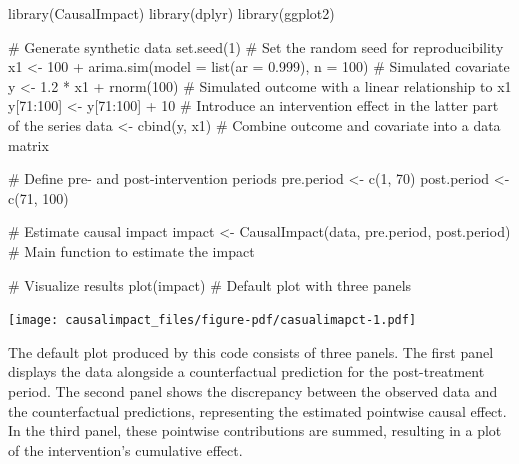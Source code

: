 \documentclass[
  letterpaper,
  DIV=11,
  numbers=noendperiod]{scrreprt}
\newenvironment{Shaded}{\begin{snugshade}}{\end{snugshade}}
\newcommand{\AttributeTok}[1]{\textcolor[rgb]{0.40,0.45,0.13}{#1}}
\newcommand{\CommentTok}[1]{\textcolor[rgb]{0.37,0.37,0.37}{#1}}
\newcommand{\DecValTok}[1]{\textcolor[rgb]{0.68,0.00,0.00}{#1}}
\newcommand{\FloatTok}[1]{\textcolor[rgb]{0.68,0.00,0.00}{#1}}
\newcommand{\FunctionTok}[1]{\textcolor[rgb]{0.28,0.35,0.67}{#1}}
\newcommand{\NormalTok}[1]{\textcolor[rgb]{0.00,0.23,0.31}{#1}}
\newcommand{\OtherTok}[1]{\textcolor[rgb]{0.00,0.23,0.31}{#1}}
\newcommand{\SpecialCharTok}[1]{\textcolor[rgb]{0.37,0.37,0.37}{#1}}
\begin{document}
\begin{Shaded}
\begin{Highlighting}[]
\FunctionTok{library}\NormalTok{(CausalImpact)  }
\FunctionTok{library}\NormalTok{(dplyr)}
\FunctionTok{library}\NormalTok{(ggplot2)}

\CommentTok{\# Generate synthetic data}
\FunctionTok{set.seed}\NormalTok{(}\DecValTok{1}\NormalTok{)  }\CommentTok{\# Set the random seed for reproducibility}
\NormalTok{x1 }\OtherTok{\textless{}{-}} \DecValTok{100} \SpecialCharTok{+} \FunctionTok{arima.sim}\NormalTok{(}\AttributeTok{model =} \FunctionTok{list}\NormalTok{(}\AttributeTok{ar =} \FloatTok{0.999}\NormalTok{), }\AttributeTok{n =} \DecValTok{100}\NormalTok{)  }\CommentTok{\# Simulated covariate}
\NormalTok{y }\OtherTok{\textless{}{-}} \FloatTok{1.2} \SpecialCharTok{*}\NormalTok{ x1 }\SpecialCharTok{+} \FunctionTok{rnorm}\NormalTok{(}\DecValTok{100}\NormalTok{)  }\CommentTok{\# Simulated outcome with a linear relationship to x1}
\NormalTok{y[}\DecValTok{71}\SpecialCharTok{:}\DecValTok{100}\NormalTok{] }\OtherTok{\textless{}{-}}\NormalTok{ y[}\DecValTok{71}\SpecialCharTok{:}\DecValTok{100}\NormalTok{] }\SpecialCharTok{+} \DecValTok{10}  \CommentTok{\# Introduce an intervention effect in the latter part of the series}
\NormalTok{data }\OtherTok{\textless{}{-}} \FunctionTok{cbind}\NormalTok{(y, x1)  }\CommentTok{\# Combine outcome and covariate into a data matrix}

\CommentTok{\# Define pre{-} and post{-}intervention periods}
\NormalTok{pre.period }\OtherTok{\textless{}{-}} \FunctionTok{c}\NormalTok{(}\DecValTok{1}\NormalTok{, }\DecValTok{70}\NormalTok{)}
\NormalTok{post.period }\OtherTok{\textless{}{-}} \FunctionTok{c}\NormalTok{(}\DecValTok{71}\NormalTok{, }\DecValTok{100}\NormalTok{)}

\CommentTok{\# Estimate causal impact}
\NormalTok{impact }\OtherTok{\textless{}{-}} \FunctionTok{CausalImpact}\NormalTok{(data, pre.period, post.period)  }\CommentTok{\# Main function to estimate the impact}

\CommentTok{\# Visualize results}
\FunctionTok{plot}\NormalTok{(impact)  }\CommentTok{\# Default plot with three panels}
\end{Highlighting}
\end{Shaded}

\texttt{[image: causalimpact\_files/figure-pdf/casualimapct-1.pdf]}

The default plot produced by this code consists of three panels. The
first panel displays the data alongside a counterfactual prediction for
the post-treatment period. The second panel shows the discrepancy
between the observed data and the counterfactual predictions,
representing the estimated pointwise causal effect. In the third panel,
these pointwise contributions are summed, resulting in a plot of the
intervention's cumulative effect.
\end{document}
